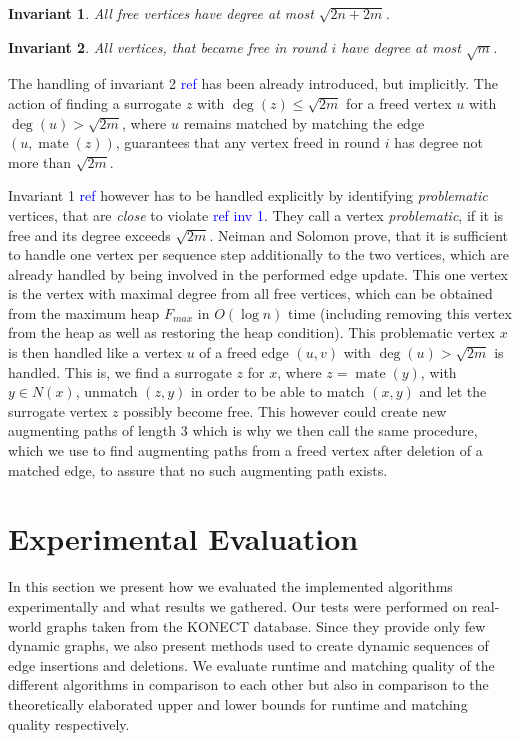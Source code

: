 \documentclass{article}      %
\newcommand\todo[1]{\textcolor{blue}{#1}}
\newtheorem{invariant}{Invariant}
\DeclareMathOperator\mate{mate}
\begin{document}
\begin{invariant} 
All free vertices have degree at most $\sqrt{2n + 2m}$.
\end{invariant}

\begin{invariant} 
All vertices, that became free in round $i$ have degree at most $\sqrt{m}$.
\end{invariant}

\noindent
The handling of invariant 2 \todo{ref} has been already introduced, but implicitly. The action of finding a surrogate $z$ with $\deg(z)\leq\sqrt{2m}$ for a freed vertex $u$ with $\deg(u)>\sqrt{2m}$, where $u$ remains matched by matching the edge $(u,\mate(z))$, guarantees that any vertex freed in round $i$ has degree not more than $\sqrt{2m}$.

Invariant 1 \todo{ref} however has to be handled explicitly by identifying \emph{problematic} vertices, that are \emph{close} to violate \todo{ref inv 1}. They call a vertex \emph{problematic}, if it is free and its degree exceeds $\sqrt{2m}$. Neiman and Solomon prove, that it is sufficient to handle one vertex per sequence step additionally to the two vertices, which are already handled by being involved in the performed edge update. This one vertex is the vertex with maximal degree from all free vertices, which can be obtained from the maximum heap $F_{max}$ in $O(\log n)$ time (including removing this vertex from the heap as well as restoring the heap condition). This problematic vertex $x$ is then handled like a vertex $u$ of a freed edge $(u,v)$ with $\deg(u) > \sqrt{2m}$ is handled. This is, we find a surrogate $z$ for $x$, where $z=\mate(y)$, with $y \in N(x)$, unmatch $(z,y)$ in order to be able to match $(x,y)$ and let the surrogate vertex $z$ possibly become free. This however could create new augmenting paths of length $3$ which is why we then call the same procedure, which we use to find augmenting paths from a freed vertex after deletion of a matched edge, to assure that no such augmenting path exists.

\pagebreak
\section{Experimental Evaluation}
\label{sec:exp-eval}

In this section we present how we evaluated the implemented algorithms experimentally and what results we gathered. Our tests were performed on real-world graphs taken from the KONECT database. Since they provide only few dynamic graphs, we also present methods used to create dynamic sequences of edge insertions and deletions. We evaluate runtime and matching quality of the different algorithms in comparison to each other but also in comparison to the theoretically elaborated upper and lower bounds for runtime and matching quality respectively.
\end{document}
